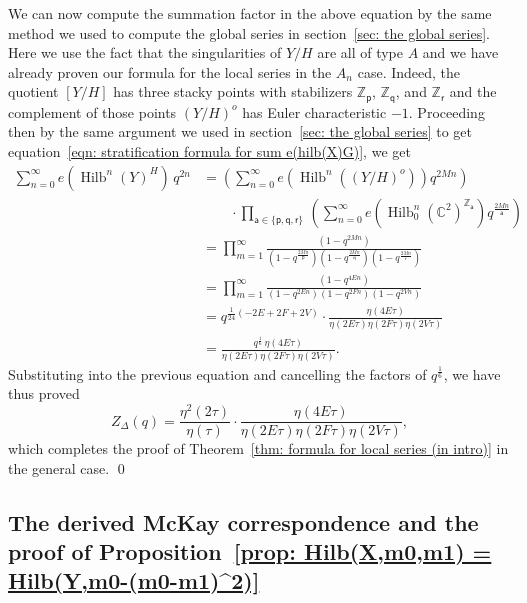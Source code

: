 \documentclass{amsart}
\theoremstyle{definition}
\newcommand{\CC} {{\mathbb C}}          %
\newcommand{\ZZ} {{\mathbb Z}}		%
\newcommand{\varp}{\mathsf{p}}
\newcommand{\varq}{\mathsf{q}}
\newcommand{\varr}{\mathsf{r}}
\newcommand{\vara}{\mathsf{a}}
\newcommand{\Hilb}{\operatorname{Hilb}}
\begin{document}
We can now compute the summation factor in the above equation by the
same method we used to compute the global series in section~\ref{sec:
the global series}. Here we use the fact that the singularities of
$Y/H$ are all of type $A$ and we have already proven our formula for
the local series in the $A_{n}$ case. Indeed, the quotient $[Y/H]$ has
three stacky points with stabilizers $\ZZ_{\varp}$, $\ZZ_{\varq}$, and
$\ZZ_{\varr}$ and the complement of those points $(Y/H)^{o}$ has Euler
characteristic $-1$. Proceeding then by the same argument we used in
section~\ref{sec: the global series} to get equation~\eqref{eqn:
stratification formula for sum e(hilb(X)G)}, we get
\begin{align*}
\sum_{n=0}^{\infty}  e\left(\Hilb^{n}(Y)^{H}\right)\, q^{2n}&=
\left(\sum_{n=0}^{\infty} e\left(\Hilb^{n}\left((Y/H)^{o} \right)
\right) q^{2Mn} \right)  \\
&\quad \quad  \cdot \prod_{\vara \in \{\varp ,\varq
,\varr  \}}\, \left( \sum_{n=0}^{\infty} e\left(\Hilb_{0}^{n}(\CC^{2})^{\ZZ_{\vara }} \right) q^{\frac{2Mn}{\vara }}  \right)\\
&=\prod_{m=1}^{\infty} \frac{\left(1-q^{2Mn} \right)}{\left(1-q^{\frac{2Mn}{\varp}} \right)\left(1-q^{\frac{2Mn}{\varq}} \right)\left(1-q^{\frac{2Mn}{\varr}} \right)}\\
&=\prod_{m=1}^{\infty} \frac{\left(1-q^{4En} \right)}{\left(1-q^{2En} \right)\left(1-q^{2Fn} \right)\left(1-q^{2Vn} \right)}\\
&=q^{\frac{1}{24}(-2E+2F+2V)}\cdot  \frac{\eta (4E\tau )}{\eta (2E\tau )\eta
(2F\tau )\eta (2V\tau )} \\
&=  \frac{q^{\frac{1}{6}}\,\eta (4E\tau )}{\eta (2E\tau )\eta
(2F\tau )\eta (2V\tau )}.
\end{align*}
Substituting into the previous equation and cancelling the factors of
$q^{\frac{1}{6}}$, we have thus proved
\[
Z_{\Delta}(q) =  \frac{\eta^{2}(2\tau )}{\eta (\tau )}\cdot \frac{\eta (4E\tau )}{\eta
(2E\tau )\eta (2F\tau )\eta (2V\tau )},
\]
which completes the proof of Theorem~\ref{thm: formula for local
series (in intro)} in the general case. \qed



\subsection{The derived McKay correspondence and the proof of
Proposition~\ref{prop: Hilb(X,m0,m1) =
Hilb(Y,m0-(m0-m1)^2)}}\label{sec: McKay correspondence}
\end{document}

